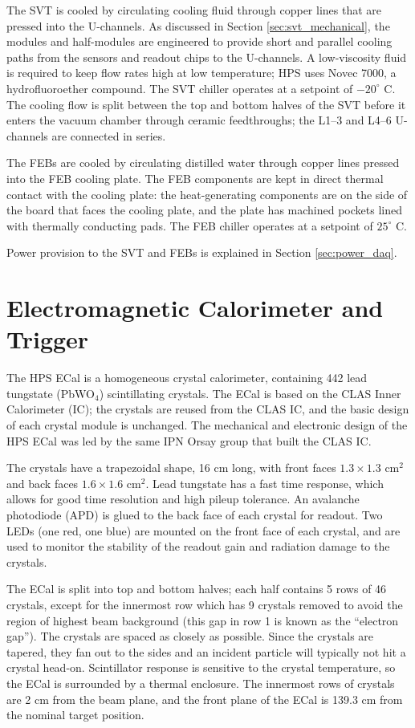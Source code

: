 The SVT is cooled by circulating cooling fluid through copper lines that are pressed into the U-channels.
As discussed in Section \ref{sec:svt_mechanical}, the modules and half-modules are engineered to provide short and parallel cooling paths from the sensors and readout chips to the U-channels.
A low-viscosity fluid is required to keep flow rates high at low temperature; HPS uses Novec 7000, a hydrofluoroether compound.
The SVT chiller operates at a setpoint of $-20^\circ$ C.
The cooling flow is split between the top and bottom halves of the SVT before it enters the vacuum chamber through ceramic feedthroughs; the L1--3 and L4--6 U-channels are connected in series.

The FEBs are cooled by circulating distilled water through copper lines pressed into the FEB cooling plate.
The FEB components are kept in direct thermal contact with the cooling plate: the heat-generating components are on the side of the board that faces the cooling plate, and the plate has machined pockets lined with thermally conducting pads.
The FEB chiller operates at a setpoint of $25^\circ$ C.

Power provision to the SVT and FEBs is explained in Section \ref{sec:power_daq}.

\section{Electromagnetic Calorimeter and Trigger}
The HPS ECal is a homogeneous crystal calorimeter, containing 442 lead tungstate (PbWO$_4$) scintillating crystals.
The ECal is based on the CLAS Inner Calorimeter (IC); the crystals are reused from the CLAS IC, and the basic design of each crystal module is unchanged.
The mechanical and electronic design of the HPS ECal was led by the same IPN Orsay group that built the CLAS IC.

The crystals have a trapezoidal shape, 16 cm long, with front faces $1.3\times 1.3$ cm$^2$ and back faces $1.6\times 1.6$ cm$^2$.
Lead tungstate has a fast time response, which allows for good time resolution and high pileup tolerance.
An avalanche photodiode (APD) is glued to the back face of each crystal for readout.
Two LEDs (one red, one blue) are mounted on the front face of each crystal, and are used to monitor the stability of the readout gain and radiation damage to the crystals.

The ECal is split into top and bottom halves; each half contains 5 rows of 46 crystals, except for the innermost row which has 9 crystals removed to avoid the region of highest beam background (this gap in row 1 is known as the ``electron gap'').
The crystals are spaced as closely as possible.
Since the crystals are tapered, they fan out to the sides and an incident particle will typically not hit a crystal head-on.
Scintillator response is sensitive to the crystal temperature, so the ECal is surrounded by a thermal enclosure.
The innermost rows of crystals are 2 cm from the beam plane, and the front plane of the ECal is 139.3 cm from the nominal target position.

